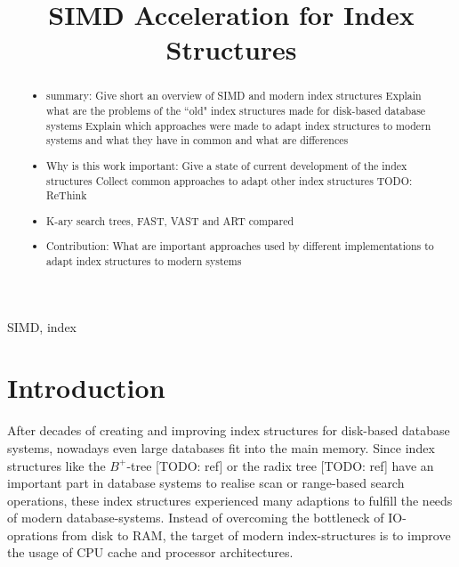 \documentclass[conference]{IEEEtran}
\begin{document}
\title{SIMD Acceleration for Index Structures\\
}

\author{
}

\maketitle

\begin{abstract}
\begin{itemize}
	\item summary: 
	\subitem Give short an overview of SIMD and modern index structures
	\subitem Explain what are the problems of the ``old" index structures made for disk-based database systems
	\subitem Explain which approaches were made to adapt index structures to modern systems and what they have in common and what are differences
	\item Why is this work important: 
	\subitem Give a state of current development of the index structures
	\subitem Collect common approaches to adapt other index structures TODO: ReThink
	\item K-ary search trees, FAST, VAST and ART compared
	\item Contribution: What are important approaches used by different implementations to adapt index structures to modern systems
\end{itemize}
\end{abstract}

\begin{IEEEkeywords}
SIMD, index 
\end{IEEEkeywords}

\section{Introduction}
After decades of creating and improving index structures for disk-based database systems, nowadays even large databases fit into the main memory. Since index structures like the $B^+$-tree [TODO: ref] or the radix tree [TODO: ref] have an important part in database systems to realise scan or range-based search operations, these index structures experienced many adaptions to fulfill the needs of modern database-systems. Instead of overcoming the bottleneck of IO-oprations from disk to RAM, the target of modern index-structures is to improve the usage of CPU cache and processor architectures.
\end{document}
